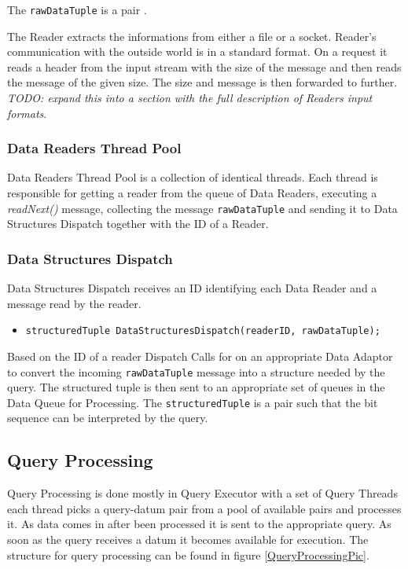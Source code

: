 \documentclass[11pt]{article}
\begin{document}
\noindent The {\tt rawDataTuple} is a pair {\tt <size, bit-string>}.

The Reader extracts the informations from either a file or a socket. Reader's communication with the outside world is in a standard format. On a request it reads a header from the input stream with the size of the message and then reads the message of the given size. The size and message is then forwarded to further. \emph{TODO: expand this into a section with the full description of Readers input formats}.

\subsubsection{Data Readers Thread Pool}

Data Readers Thread Pool is a collection of identical threads. Each thread is responsible for getting a reader from the queue of Data Readers, executing a \emph{readNext()} message, collecting the message {\tt rawDataTuple} and sending it to Data Structures Dispatch together with the ID of a Reader.

\subsubsection{Data Structures Dispatch}

Data Structures Dispatch receives an ID identifying each Data Reader and a message read by the reader. 

\begin{itemize}
	\item {\tt structuredTuple DataStructuresDispatch(readerID, rawDataTuple);}
\end{itemize}

Based on the ID of a reader Dispatch Calls for on an appropriate Data Adaptor to convert the incoming {\tt rawDataTuple} message into a structure needed by the query. The structured tuple is then sent to an appropriate set of queues in the Data Queue for Processing. The {\tt structuredTuple} is a pair {\tt <size, bit-sequence>} such that the bit sequence can be interpreted by the query. 

\subsection{Query Processing}

Query Processing is done mostly in Query Executor with a set of Query Threads each thread picks a query-datum pair from a pool of available pairs and processes it. As data comes in after been processed it is sent to the appropriate query. As soon as the query receives a datum it becomes available for execution. The structure for query processing can be found in figure \ref{QueryProcessingPic}.
\end{document}
